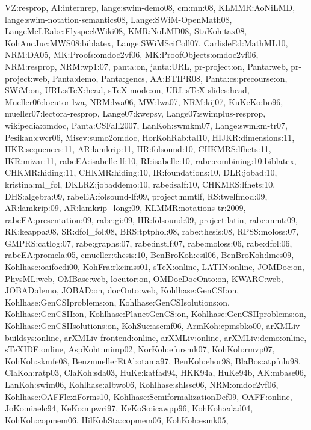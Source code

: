 {VZ:resprop,%
AI:internrep,%
lange:swim-demo08,%
cm:mn:08,%
KLMMR:AoNiLMD,%
lange:swim-notation-semantics08,%
Lange:SWiM-OpenMath08,%
LangeMcLRabe:FlyspeckWiki08,%
KMR:NoLMD08,%
StaKoh:tax08,%
KohAncJuc:MWS08:biblatex,%
Lange:SWiMSciColl07,%
CarlisleEd:MathML10,%
NRM:DA05,%
MK:Proofs:omdoc2vf06,%
MK:ProofObjects:omdoc2vf06,%
NRM:resprop,%
NRM:wp1:07,%
panta:on,%
janta:URL,%
pr-project:on,%
Panta:web,%
pr-project:web,%
Panta:demo,%
Panta:gencs,%
AA:BTIPR08,%
Panta:cs:precourse:on,%
SWiM:on,%
URL:sTeX:head,%
sTeX-mode:on,%
URL:sTeX-slides:head,%
Mueller06:locutor-lwa,%
NRM:lwa06,%
MW:lwa07,%
NRM:kij07,%
KuKeKo:bo96,%
mueller07:lectora-resprop,%
Lange07:kwepsy,%
Lange07:swimplus-resprop,%
wikipedia:omdoc,%
Panta:CSFall2007,%
LanKoh:swmkm07,%
Lange:swmkm-tr07,%
Pesikan:cwcr06,%
Misev:sumo2omdoc,%
HorKohRab:tal10,%
HIJKR:dimensions:11,%
HKR:sequences:11,%
AR:lamkrip:11,%
HR:folsound:10,%
CHKMRS:lfhets:11,%
IKR:mizar:11,%
rabeEA:isabelle-lf:10,%
RI:isabelle:10,%
rabe:combining:10:biblatex,%
CHKMR:hiding:11,%
CHKMR:hiding:10,%
IR:foundations:10,%
DLR:jobad:10,%
kristina:ml_fol,%
DKLRZ:jobaddemo:10,%
rabe:isalf:10,%
CHKMRS:lfhets:10,%
DHS:algebra:09,%
rabeEA:folsound-lf:09,%
project:mmtlf,%
RS:twelfmod:09,%
AR:lamkrip:09,%
AR:lamkrip_long:09,%
KLMMR:notations-tr:2009,%
rabeEA:presentation:09,%
rabe:gi:09,%
HR:folsound:09,%
project:latin,%
rabe:mmt:09,%
RK:keappa:08,%
SR:dfol_fol:08,%
BRS:tptphol:08,%
rabe:thesis:08,%
RPSS:moloss:07,%
GMPRS:catlog:07,%
rabe:graphs:07,%
rabe:instlf:07,%
rabe:moloss:06,%
rabe:dfol:06,%
rabeEA:promela:05,%
cmueller:thesis:10,%
BenBroKoh:csil06,%
BenBroKoh:lmcs09,%
Kohlhase:oaifocdi00,%
KohFra:rkcimss01,%
sTeX:online,%
LATIN:online,%
JOMDoc:on,%
PhysML:web,%
OMBase:web,%
locutor:on,%
OMDocDocOnto:on,%
KWARC:web,%
JOBAD:demo,%
JOBAD:on,%
docOnto:web,%
Kohlhase:GenCSI:on,%
Kohlhase:GenCSIproblems:on,%
Kohlhase:GenCSIsolutions:on,%
Kohlhase:GenCSII:on,%
Kohlhase:PlanetGenCS:on,%
Kohlhase:GenCSIIproblems:on,%
Kohlhase:GenCSIIsolutions:on,%
KohSuc:asemf06,%
ArmKoh:cpmsbko00,%
arXMLiv-buildsys:online,%
arXMLiv-frontend:online,%
arXMLiv:online,%
arXMLiv:demo:online,%
sTeXIDE:online,%
AspKoht:mimp02,%
NorKoh:efnrsmk07,%
KohKoh:rmvp07,%
KohKoh:skmfe08,%
BenzmuellerEtAl:otama97,%
BenKoh:ehor98,%
BlaBos:atpfnlu98,%
ClaKoh:ratp03,%
ClaKoh:sda03,%
HuKe:katfad94,%
HKK94a,%
HuKe94b,%
AK:mbase06,%
LanKoh:swim06,%
Kohlhase:albwo06,%
Kohlhase:shlssc06,%
NRM:omdoc2vf06,%
Kohlhase:OAFFlexiForms10,%
Kohlhase:SemiformalizationDef09,%
OAFF:online,%
JoKo:uiaelc94,%
KeKo:mpwri97,%
KeKoSo:icawpp96,%
KohKoh:cdad04,%
KohKoh:copmem06,%
HilKohSta:copmem06,%
KohKoh:esmk05,%
}
